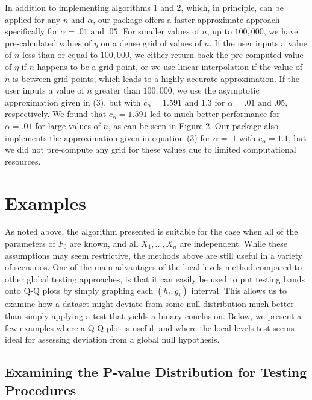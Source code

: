 \documentclass[article]{jss}
\begin{document}
\newline
\newline
In addition to implementing algorithms 1 and 2, which, in principle, can be applied for any $n$ and $\alpha$, our package offers a faster approximate approach specifically for $\alpha = .01 \textrm{ and } .05$. For smaller values of $n$, up to $100,000$, we have pre-calculated values of $\eta$ on a dense grid of values of $n$. If the user inputs a value of $n$ less than or equal to $100,000$, we either return back the pre-computed value of $\eta$ if $n$ happens to be a grid point, or we use linear interpolation if the value of $n$ is between grid points, which leads to a highly accurate approximation. If the user inputs a value of $n$ greater than $100,000$, we use the asymptotic approximation given in (3), but with $c_{\alpha} = 1.591 \textrm{ and } 1.3$ for $\alpha = .01 \textrm{ and } .05$, respectively. We found that $c_{\alpha} = 1.591$ led to much better performance for $\alpha = .01$ for large values of $n$, as can be seen in Figure 2. Our package also implements the approximation given in equation (3) for $\alpha = .1$ with $c_{\alpha} = 1.1$, but we did not pre-compute any grid for these values due to limited computational resources.
\section{Examples}
\label{sec:examples}
As noted above, the algorithm presented is suitable for the case when all of the parameters of $F_{0}$ are known, and all $X_{1}, ..., X_{n}$ are independent. While these assumptions may seem restrictive, the methods above are still useful in a variety of scenarios.
\newline
\newline
One of the main advantages of the local levels method compared to other global testing approaches, is that it can easily be used to put testing bands onto Q-Q plots by simply graphing each $(h_{i}, g_{i})$ interval. This allows us to examine how a dataset might deviate from some null distribution much better than simply applying a test that yields a binary conclusion. Below, we present a few examples where a Q-Q plot is useful, and where the local levels test seems ideal for assessing deviation from a global null hypothesis.

\subsection{Examining the P-value Distribution for Testing Procedures}
\end{document}
